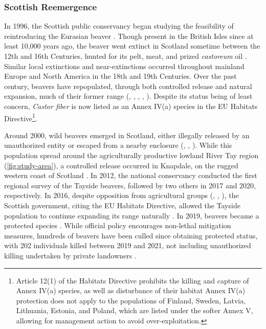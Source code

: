 \subsubsection{Scottish Reemergence}

In 1996, the Scottish public conservancy began studying the feasibility of reintroducing the Eurasian beaver \citep{kitchener_history_1997}. Though present in the British Isles since at least 10,000 years ago, the beaver went extinct in Scotland sometime between the 12th and 16th Centuries, hunted for its pelt, meat, and prized \textit{castoreum} oil \citep{kitchener_history_1997}. Similar local extinctions and near-extinctions occurred throughout mainland Europe and North America in the 18th and 19th Centuries. Over the past century, beavers have repopulated, through both controlled release and natural expansion, much of their former range (\cite{dzieciolowski_reintroduction_1999}, \cite{janiszewski_restoration_2021}, \cite{schwab_beaver_2003}, \cite{hartman_patterns_1995}, \cite{dijkstra_reintroduction_1999}). Despite its status being of least concern, \textit{Castor fiber} is now listed as an Annex IV(a) species in the EU Habitats Directive\footnote{Article 12(1) of the Habitats Directive prohibits the killing and capture of Annex IV(a) species, as well as disturbance of their habitat \citep{noauthor_council_2013} Annex IV(a) protection does not apply to the populations of Finland, Sweden, Latvia, Lithuania, Estonia, and Poland, which are listed under the softer Annex V, allowing for management action to avoid over-exploitation.}. 

Around 2000, wild beavers emerged in Scotland, either illegally released by an unauthorized entity or escaped from a nearby enclosure (\cite{goldfarb_eager_2018}, \cite{campbell-palmer_managing_2015}, \cite{gaywood_reintroducing_2018}). While this population spread around the agriculturally productive lowland River Tay region (\ref{fig:study-area}), a controlled release occurred in Knapdale, on the rugged western coast of Scotland \citep{campbell-palmer_managing_2015}. In 2012, the national conservancy conducted the first regional survey of the Tayside beavers, followed by two others in 2017 and 2020, respectively. In 2016, despite opposition from agricultural groups (\cite{castle_beavers_2021}, \cite{kennedy_nfu_2023}, \cite{werth_christopher_beavers_2017}), the Scottish government, citing the EU Habitats Directive, allowed the Tayside population to continue expanding its range naturally \citep{noauthor_beavers_2017}. In 2019, beavers became a protected species \citep{noauthor_beavers_2019}. While official policy encourages non-lethal mitigation measures, hundreds of beavers have been culled since obtaining protected status, with 202 individuals killed between 2019 and 2021, not including unauthorized killing undertaken by private landowners \citep{williams_more_2021}. 


